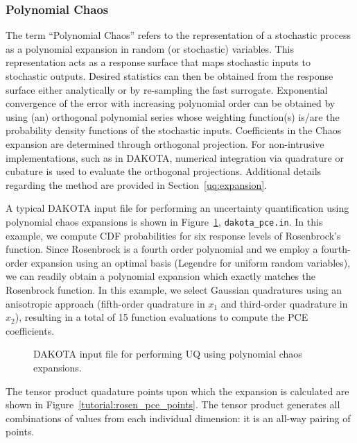 \subsubsection{Polynomial Chaos}\label{tutorial:example:uncert_quant:poly_chaos}
The term ``Polynomial Chaos'' refers to the representation of a stochastic 
process as a polynomial expansion in random (or stochastic) variables. This 
representation acts as a response surface that maps stochastic inputs to 
stochastic outputs.  Desired statistics can then be obtained from the 
response surface either analytically or by re-sampling the fast surrogate.
Exponential convergence of the error with increasing polynomial order can 
be obtained by using (an) orthogonal polynomial series whose weighting 
function(s) is/are the probability density functions of the stochastic 
inputs. Coefficients in the Chaos expansion are determined through
orthogonal projection. For non-intrusive implementations, such as in DAKOTA,
numerical integration via quadrature or cubature is used to evaluate the 
orthogonal projections.  Additional details regarding the method are 
provided in Section~\ref{uq:expansion}.

A typical DAKOTA input file for performing an uncertainty
quantification using polynomial chaos expansions is shown in
Figure~\ref{tutorial:pce}, \texttt{dakota\_pce.in}.
In this example, we compute CDF
probabilities for six response levels of Rosenbrock's function.  Since
Rosenbrock is a fourth order polynomial and we employ a fourth-order
expansion using an optimal basis (Legendre for uniform random
variables), we can readily obtain a polynomial expansion which exactly
matches the Rosenbrock function.  In this example, we select Gaussian
quadratures using an anisotropic approach (fifth-order quadrature in
$x_1$ and third-order quadrature in $x_2$), resulting in a total of
15 function evaluations to compute the PCE coefficients.

\begin{figure}
  \centering
  \begin{bigbox}
    \begin{small}
    \end{small}
  \end{bigbox}
\caption{DAKOTA input file for performing UQ using polynomial chaos expansions.}
\label{tutorial:pce}
\end{figure}

The tensor product quadature points upon which the expansion is calculated 
are shown in Figure~\ref{tutorial:rosen_pce_points}.  
The tensor product generates
all combinations of values from each individual dimension: it is an 
all-way pairing of points.

